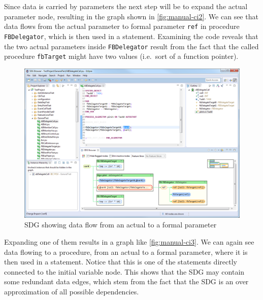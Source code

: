 Since data is carried by parameters the next step will be to expand the actual parameter node, resulting in the graph 
shown in \autoref{fig:manual-ci2}. We can see that data flows from the actual parameter to formal parameter 
\lstinline|ref| in procedure \lstinline|FBDelegator|, which is then used in a statement. Examining the code reveals 
that the two actual parameters inside \lstinline|FBDelegator| result from the fact that the called procedure 
\lstinline|fbTarget| might have two values (i.e.\ sort of a function pointer).

\begin{figure}[hpb]
  \centering
    \includegraphics[width=\textwidth]{bilder/manual-ci2}
  \caption{SDG showing data flow from an actual to a formal parameter}
  \label{fig:manual-ci2}
\end{figure}

Expanding one of them results in a graph like \autoref{fig:manual-ci3}. We can again see data flowing to a procedure, 
from an actual to a formal parameter, where it is then used in a statement. Notice that this is one of the statements 
directly connected to the initial variable node. This shows that the SDG may contain some redundant data edges, which 
stem from the fact that the SDG is an over approximation of all possible dependencies.

